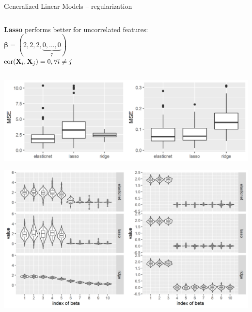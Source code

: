 \documentclass[11pt,compress,t,notes=noshow, xcolor=table]{beamer}
\begin{document}
\begin{vbframe}{Generalized Linear Models -- regularization}
\begin{columns}[T, totalwidth=\textwidth]
\begin{column}{0.38\textwidth}
\begin{columns}[T, totalwidth=\textwidth]
\begin{column}{0.5\textwidth}
\begin{center}
\textbf{Lasso} performs better for uncorrelated features: \\
\medskip
$\boldsymbol{\beta}=(2, 2, 2,\underbrace{0,\ldots,0}_{7})$ \\
$\operatorname{cor}(\mathbf{X}_{i},\mathbf{X}_{j})= 0, \forall i \neq j$
\end{center}
\end{column}
\end{columns}



          \includegraphics[width=\textwidth]{figure/enet_lasso_ridge_mse.png}
          
          \includegraphics[width=\textwidth]{figure/enet_tradeoff.png}
\end{column}

\end{columns}
  
\end{vbframe}
\end{document}
